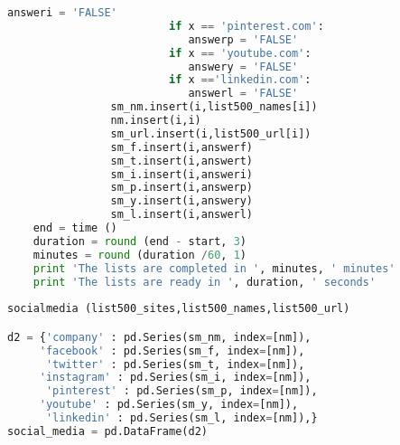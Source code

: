 \documentclass{article}
\begin{document}
\begin{lstlisting}[language=Python]
                            answeri = 'FALSE'
                         if x == 'pinterest.com':
                            answerp = 'FALSE'
                         if x == 'youtube.com':
                            answery = 'FALSE'
                         if x =='linkedin.com':
                            answerl = 'FALSE'                
                sm_nm.insert(i,list500_names[i]) 
                nm.insert(i,i)
                sm_url.insert(i,list500_url[i])
                sm_f.insert(i,answerf)
                sm_t.insert(i,answert)
                sm_i.insert(i,answeri)
                sm_p.insert(i,answerp)
                sm_y.insert(i,answery)
                sm_l.insert(i,answerl)
    end = time ()
    duration = round (end - start, 3)
    minutes = round (duration /60, 1)
    print 'The lists are completed in ', minutes, ' minutes' 
    print 'The lists are ready in ', duration, ' seconds'
 
socialmedia (list500_sites,list500_names,list500_url)

d2 = {'company' : pd.Series(sm_nm, index=[nm]),
     'facebook' : pd.Series(sm_f, index=[nm]),
      'twitter' : pd.Series(sm_t, index=[nm]),
     'instagram' : pd.Series(sm_i, index=[nm]),
      'pinterest' : pd.Series(sm_p, index=[nm]),
     'youtube' : pd.Series(sm_y, index=[nm]),
      'linkedin' : pd.Series(sm_l, index=[nm]),}
social_media = pd.DataFrame(d2) 
\end{lstlisting}
\end{document}
